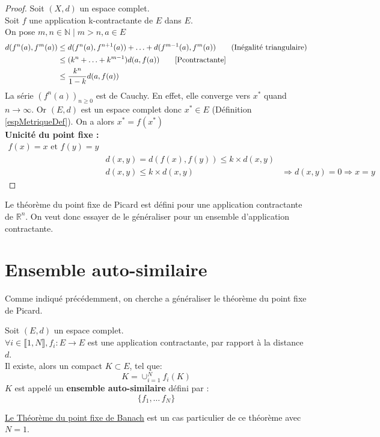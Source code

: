 \documentclass[a4paper, 12pt]{report}
\begin{document}
			\begin{proof}
				Soit $(X,d)$ un espace complet.\\
				Soit $f$ une application k-contractante de $E$ dans $E$.\\
				On pose $m,n\in\mathds{N}\mid m>n,a\in E$\\
				\begin{align*}
					d(f^n(a),f^m(a))&\leq d(f^n(a),f^{n+1}(a))+\ldots+d(f^{m-1}(a),f^m(a))  \tag{Inégalité triangulaire}\\
									&\leq (k^n+\ldots+k^{m-1})d(a,f(a)) \tag*{\eqref{Pcontractante}}\\
									&\leq \frac{k^n}{1-k}d(a,f(a))
				\end{align*}
				La série $(f^n(a))_{n\geq 0}$ est de Cauchy. En effet, elle converge vers $x^*$ quand $n\longrightarrow\infty$.
				Or $(E,d)$ est un espace complet donc $x^*\in E$ (Définition \ref{espMetriqueDef}).
				On a alors $x^*=f(x^*)$\\
				\textbf{Unicité du point fixe :}
				\begin{align*}
					f(x)=x \textrm{ et } f(y)=y\\
					&d(x,y) = d(f(x),f(y)) \leq k\times d(x,y)\\
					&d(x,y) \leq k\times d(x,y)
					&\Rightarrow d(x,y)=0\Rightarrow x=y \tag{Unicité}
				\end{align*}
			\end{proof}
			\hspace{.7 cm} Le théorème du point fixe de Picard est défini pour une application contractante de $\mathds{R}^n$. On veut donc essayer de le généraliser pour un ensemble d'application contractante.
\newpage
		\section{Ensemble auto-similaire}
			Comme indiqué précédemment, on cherche a généraliser le théorème du point fixe de Picard.
			\begin{theorem}
			\label{thmPrincipale}
				Soit $(E,d)$ un espace complet.\\
				$\forall i \in \llbracket 1,N \rrbracket, f_i:E \longrightarrow E$ est une application contractante, par rapport à la distance $d$.\\
				Il existe, alors un compact $K\subset E$, tel que:
				\begin{equation*}
					K=\cup^N_{i=1}f_i(K)
				\end{equation*}
				$K$ est appelé un \textbf{ensemble auto-similaire} défini par :
				\begin{equation*}
					\{f_1,\ldots\,f_N\}
				\end{equation*}
			\end{theorem}
			\begin{remark*}
			\hyperref[ThmPtFixe]{Le Théorème du point fixe de Banach} est un cas particulier de ce théorème avec $N=1$.
			\end{remark*}
		
\end{document}
